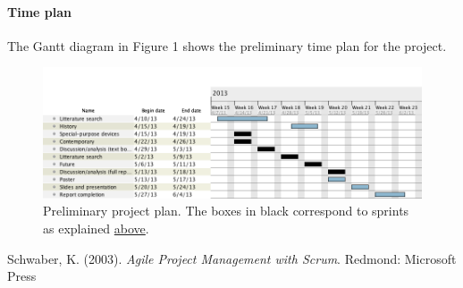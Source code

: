 \documentclass[a4paper,10pt]{article}
\begin{document}
\paragraph{Time plan}

The Gantt diagram in Figure 1 shows the preliminary time plan for the project. 

\begin{figure}[h!]
\includegraphics[width=\textwidth]{ganttuppsats.png}
\caption{Preliminary project plan. The boxes in black correspond to sprints as explained \hyperref[sec:method]{above}.}
\label{fig:timePlan}
\end{figure}


\begin{thebibliography}{4}
 Schwaber, K. (2003). \emph{Agile Project Management with Scrum}. Redmond: Microsoft Press
\end{thebibliography}
\end{document}
